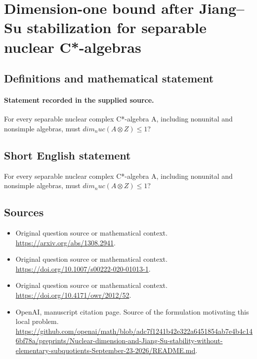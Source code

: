 \documentclass[11pt]{article}
\begin{document}
\section*{Dimension-one bound after Jiang–Su stabilization for separable nuclear C*-algebras}\label{statement}
\subsection{Definitions and mathematical statement}
\paragraph{Statement recorded in the supplied source.}
For every separable nuclear complex C*-algebra A, including nonunital and nonsimple algebras, must $dim_nuc(A\otimes Z)\leq 1$?
\subsection{Short English statement}
For every separable nuclear complex C*-algebra A, including nonunital and nonsimple algebras, must $dim_nuc(A\otimes Z)\leq 1$?
\subsection{Sources}
\begin{itemize}
\item[S1] Original question source or mathematical context.
\url{https://arxiv.org/abs/1308.2941}.
\item[S2] Original question source or mathematical context.
\url{https://doi.org/10.1007/s00222-020-01013-1}.
\item[S3] Original question source or mathematical context.
\url{https://doi.org/10.4171/owr/2012/52}.
\item[S4] OpenAI, manuscript citation page. Source of the formulation motivating this local problem.
\url{https://github.com/openai/math/blob/adc7f1241b42e322a6451854ab7e4b4c146bf78a/preprints/Nuclear-dimension-and-Jiang-Su-stability-without-elementary-subquotients-September-23-2026/README.md}.
\end{itemize}
\end{document}
